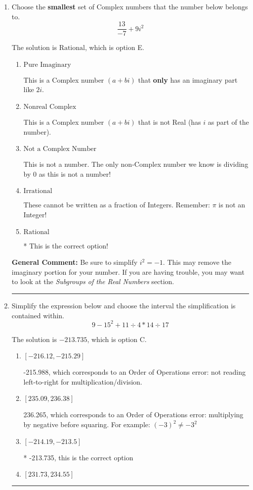 \documentclass{extbook}[14pt]
\newcommand{\litem}[1]{\item #1

\rule{\textwidth}{0.4pt}}
\begin{document}
\begin{enumerate}\litem{
Choose the \textbf{smallest} set of Complex numbers that the number below belongs to.
\[ \frac{13}{-7}+9i^2 \]

The solution is \( \text{Rational} \), which is option E.\begin{enumerate}[label=\Alph*.]
\item \( \text{Pure Imaginary} \)

This is a Complex number $(a+bi)$ that \textbf{only} has an imaginary part like $2i$.
\item \( \text{Nonreal Complex} \)

This is a Complex number $(a+bi)$ that is not Real (has $i$ as part of the number).
\item \( \text{Not a Complex Number} \)

This is not a number. The only non-Complex number we know is dividing by 0 as this is not a number!
\item \( \text{Irrational} \)

These cannot be written as a fraction of Integers. Remember: $\pi$ is not an Integer!
\item \( \text{Rational} \)

* This is the correct option!
\end{enumerate}

\textbf{General Comment:} Be sure to simplify $i^2 = -1$. This may remove the imaginary portion for your number. If you are having trouble, you may want to look at the \textit{Subgroups of the Real Numbers} section.
}
\litem{
Simplify the expression below and choose the interval the simplification is contained within.
\[ 9 - 15^2 + 11 \div 4 * 14 \div 17 \]

The solution is \( -213.735 \), which is option C.\begin{enumerate}[label=\Alph*.]
\item \( [-216.12, -215.29] \)

 -215.988, which corresponds to an Order of Operations error: not reading left-to-right for multiplication/division.
\item \( [235.09, 236.38] \)

 236.265, which corresponds to an Order of Operations error: multiplying by negative before squaring. For example: $(-3)^2 \neq -3^2$
\item \( [-214.19, -213.5] \)

* -213.735, this is the correct option
\item \( [231.73, 234.55] \)


\end{enumerate}}
\end{enumerate}
\end{document}
